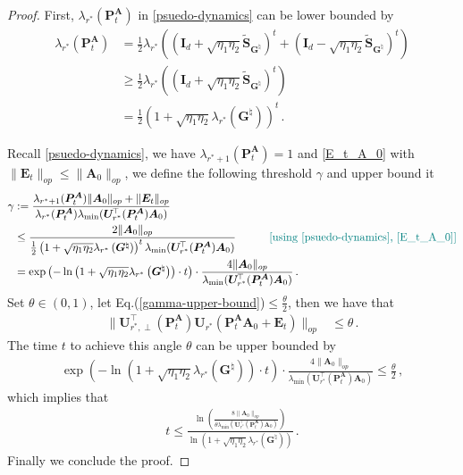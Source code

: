 \begin{proof}
    First, $\lambda_{r^*}(\bm P_t^{\bm A})$ in \cref{psuedo-dynamics} can be lower bounded by
    \begin{equation}\label{eq:lambdarpta}
      \begin{split}
            \lambda_{r^*}(\bm P_t^{\bm A}) & = \frac{1}{2}\lambda_{r^*}\left((\bm I_d+\sqrt{\eta_1 \eta_2}\widetilde{\bm S}_{\bm G^\natural})^t + (\bm I_d-\sqrt{\eta_1 \eta_2}\widetilde{\bm S}_{\bm G^\natural})^t\right)\\ 
        & \geq \frac{1}{2}\lambda_{r^*}\left((\bm I_d+\sqrt{\eta_1 \eta_2}\widetilde{\bm S}_{\bm G^\natural})^t\right)\\
        & = \frac{1}{2}\left(1+\sqrt{\eta_1 \eta_2}\lambda_{r^*}\left({\bm G}^{\natural}\right)\right)^t\,.
      \end{split}  
    \end{equation}

    Recall \cref{psuedo-dynamics}, we have $\lambda_{r^*+1}(\bm P_t^{\bm A}) = 1$ and \cref{E_t_A_0} with $\|\bm E_t\|_{op} \leq \|\bm A_0\|_{op}$, we define the following threshold $\gamma$ and upper bound it
    \begin{align}
        \gamma & := \frac{\lambda_{r^*+1}(\bm P_t^{\bm A})\|\bm A_0\|_{op}+\|\bm E_t\|_{op}}{\lambda_{r^*}(\bm P_t^{\bm A})\lambda_{\min}(\bm U^{\!\top}_{r^*}(\bm P_t^{\bm A}) \bm A_0)}\nonumber\\
        & \leq \frac{2\|\bm A_0\|_{op}}{\frac{1}{2}\left(1+\sqrt{\eta_1 \eta_2}\lambda_{r^*}\left({\bm G}^{\natural}\right)\right)^t \lambda_{\min}(\bm U^{\!\top}_{r^*}(\bm P_t^{\bm A}) \bm A_0)} \quad \tag*{\color{teal}[using~\cref{psuedo-dynamics},~\ref{E_t_A_0}]} \nonumber\\
        & = \exp\left(-\ln\left(1+\sqrt{\eta_1 \eta_2}\lambda_{r^*}\left({\bm G}^{\natural}\right)\right)\cdot t\right)\cdot\frac{4\|\bm A_0\|_{op}}{\lambda_{\min}(\bm U^{\!\top}_{r^*}(\bm P_t^{\bm A}) \bm A_0)}\, .\label{gamma-upper-bound}
    \end{align}
    Set $\theta\in(0,1)$, let Eq.(\ref{gamma-upper-bound})$\leq \frac{\theta}{2}$, then we have that
    \begin{align*}
        \|\bm U^{\!\top}_{r^*,\perp}(\bm P_t^{\bm A})\bm U_{r^*}(\bm P_t^{\bm A}\bm A_0+\bm E_t)\|_{op} & \leq \theta\, .
    \end{align*}
    The time $t$ to achieve this angle $\theta$ can be upper bounded by
    \begin{align*}
        \exp\left(-\ln\left(1+\sqrt{\eta_1 \eta_2}\lambda_{r^*}\left({\bm G}^{\natural}\right)\right)\cdot t\right)\cdot\frac{4\|\bm A_0\|_{op}}{\lambda_{\min}(\bm U^{\!\top}_{r^*}(\bm P_t^{\bm A}) \bm A_0)} \leq \frac{\theta}{2}\,,
        \end{align*}
   which implies that     
        \begin{align*}
        t \leq \frac{\ln\left(\frac{8\|\bm A_0\|_{op}}{\theta \lambda_{\min}(\bm U^{\!\top}_{r^*}(\bm P_t^{\bm A}) \bm A_0)}\right)}{\ln\left(1+\sqrt{\eta_1 \eta_2}\lambda_{r^*}\left({\bm G}^{\natural}\right)\right)}\, .
    \end{align*}
    Finally we conclude the proof.
\end{proof}

